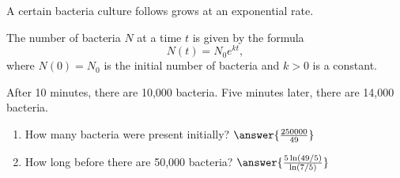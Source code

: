 \documentclass{ximera}
\author{Kenneth Berglund}
\begin{document}
\licenseSZ
\begin{exercise}
A certain bacteria culture follows grows at an exponential rate.

The number of bacteria $N$ at a time $t$ is given by the formula
$$
N(t) = N_0 e^{kt},
$$
where $N(0) = N_0$ is the initial number of bacteria and $k > 0$ is a constant.

After 10 minutes, there are 10,000 bacteria. Five minutes later, there are 14,000 bacteria. 

\begin{enumerate}
\item How many bacteria were present initially? $\answer{\frac{250000}{49}}$
\item How long before there are 50,000 bacteria? $\answer{\frac{5\ln(49/5)}{\ln(7/5)}}$
\end{enumerate}


\end{exercise}
\end{document}
